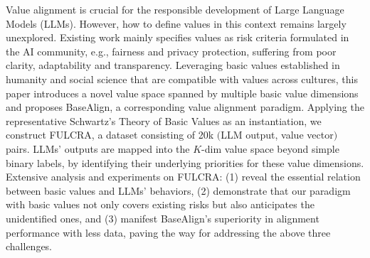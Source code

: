 Value alignment is crucial for the responsible development of Large Language Models (LLMs). However, how to define values in this context remains largely unexplored. Existing work mainly specifies values as risk criteria formulated in the AI community, e.g., fairness and privacy protection, suffering from poor clarity, adaptability and transparency. Leveraging basic values established in humanity and social science that are compatible with values across cultures, this paper introduces a novel value space spanned by multiple basic value dimensions and proposes BaseAlign, a corresponding value alignment paradigm. Applying the representative Schwartz's Theory of Basic Values as an instantiation, we construct FULCRA, a dataset consisting of 20k $($LLM output, value vector$)$ pairs. LLMs' outputs are mapped into the $K$-dim value space beyond simple binary labels, by identifying their underlying priorities for these value dimensions. Extensive analysis and experiments on FULCRA: (1) reveal the essential relation between basic values and LLMs' behaviors, (2) demonstrate that our paradigm with basic values not only covers existing risks but also anticipates the unidentified ones, and (3) manifest BaseAlign's superiority in alignment performance with less data, paving the way for addressing the above three challenges.